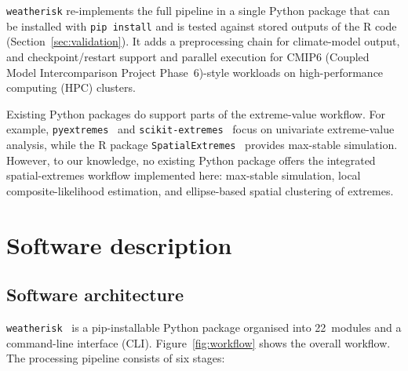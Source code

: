 \documentclass[preprint,12pt,a4paper]{elsarticle}
\begin{document}
\texttt{weatherisk} re-implements the full pipeline in a single
Python package that can be installed with \texttt{pip install} and is
tested against stored outputs of the R code
(Section~\ref{sec:validation}). It adds a preprocessing chain for
climate-model output, and checkpoint/restart support and parallel
execution for CMIP6 (Coupled Model Intercomparison
Project Phase~6)-style workloads on high-performance computing (HPC)
clusters.

Existing Python packages do support parts of the extreme-value workflow.
For example, \texttt{pyextremes}~\cite{pyextremes} and
\texttt{scikit-extremes}~\cite{scikitextremes}
focus on univariate extreme-value analysis, while the R package
\texttt{SpatialExtremes}~\cite{spatialextremes} provides max-stable simulation.
However, to our knowledge, no existing Python package offers the
integrated spatial-extremes workflow implemented here: max-stable
simulation, local composite-likelihood estimation, and ellipse-based
spatial clustering of extremes.

\section{Software description}
\label{sec:description}

\subsection{Software architecture}
\label{sec:architecture}

\texttt{weatherisk}~\cite{weatherisk} is a pip-installable Python package organised
into 22~modules and a command-line interface (CLI).  Figure~\ref{fig:workflow}
shows the overall workflow. The processing pipeline consists of six
stages:
\end{document}
